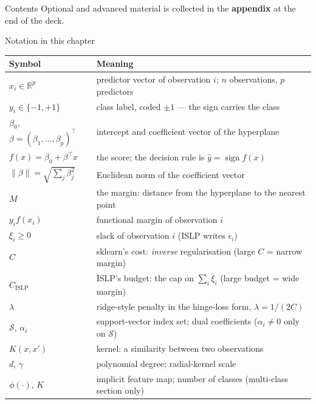\documentclass[aspectratio=169,11pt]{beamer}
\begin{document}
\begin{frame}{Contents}\small\tableofcontents[hideallsubsections]
  \vfill
  {\tiny Optional and advanced material is collected in the \textbf{appendix} at the end of the deck.}
\end{frame}

\begin{frame}{Notation in this chapter}
  \scriptsize
  \begin{center}
  \begin{tabular}{@{}ll@{}}
    \toprule
    \textbf{Symbol} & \textbf{Meaning} \\
    \midrule
    $x_i \in \mathbb{R}^p$ & predictor vector of observation $i$; $n$ observations, $p$ predictors \\
    $y_i \in \{-1,+1\}$ & class label, coded $\pm 1$ --- the sign carries the class \\
    $\beta_0$, $\beta=(\beta_1,\dots,\beta_p)^\top$ & intercept and coefficient vector of the hyperplane \\
    $f(x)=\beta_0+\beta^\top x$ & the score; the decision rule is $\hat y = \operatorname{sign} f(x)$ \\
    $\|\beta\|=\sqrt{\sum_j \beta_j^2}$ & Euclidean norm of the coefficient vector \\
    $M$ & the margin: distance from the hyperplane to the nearest point \\
    $y_i f(x_i)$ & functional margin of observation $i$ \\
    $\xi_i \ge 0$ & slack of observation $i$ (ISLP writes $\epsilon_i$) \\
    $C$ & sklearn's cost: \emph{inverse} regularisation (large $C$ = narrow margin) \\
    $C_{\text{ISLP}}$ & ISLP's budget: the cap on $\sum_i \xi_i$ (large budget = wide margin) \\
    $\lambda$ & ridge-style penalty in the hinge-loss form, $\lambda = 1/(2C)$ \\
    $\mathcal{S}$, $\alpha_i$ & support-vector index set; dual coefficients ($\alpha_i\neq0$ only on $\mathcal{S}$) \\
    $K(x,x')$ & kernel: a similarity between two observations \\
    $d$, $\gamma$ & polynomial degree; radial-kernel scale \\
    $\phi(\cdot)$, $K$ & implicit feature map; number of classes (multi-class section only) \\
    \bottomrule
  \end{tabular}
  \end{center}
\end{frame}
\end{document}

